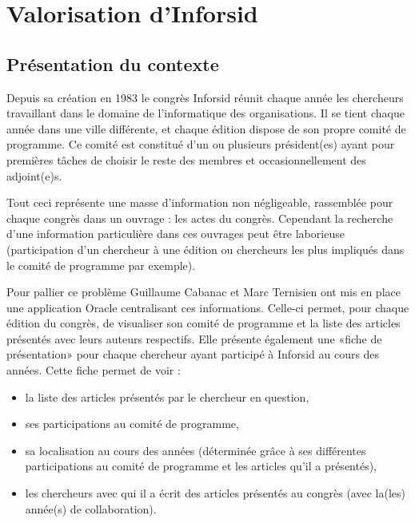 \cleardoublepage
{}

\chapter{Valorisation d'Inforsid}


	\section{Présentation du contexte}
		Depuis sa création en 1983 le congrès Inforsid réunit chaque année les chercheurs travaillant dans le domaine de l\rq{}informatique des organisations. Il se tient chaque année dans une ville différente, et chaque édition dispose de son propre comité de programme. Ce comité est constitué d\rq{}un ou plusieurs président(es) ayant pour premières tâches de choisir le reste des membres et occasionnellement des adjoint(e)s.
	
		Tout ceci représente une masse d\rq{}information non négligeable, rassemblée pour chaque congrès dans un ouvrage : les actes du congrès. Cependant la recherche d\rq{}une information particulière dans ces ouvrages peut être laborieuse (participation d\rq{}un chercheur à une édition ou chercheurs les plus impliqués dans le comité de programme par exemple).
		
		Pour pallier ce problème Guillaume Cabanac et Marc Ternisien ont mis en place une application Oracle centralisant ces informations. Celle-ci permet, pour chaque édition du congrès, de visualiser son comité de programme et la liste des articles présentés avec leurs auteurs respectifs. Elle présente également une «fiche de présentation» pour chaque chercheur ayant participé à Inforsid au cours des années. Cette fiche permet de voir :
		\begin{itemize}
			\item la liste des articles présentés par le chercheur en question,
			\item ses participations au comité de programme,
			\item sa localisation au cours des années (déterminée grâce à ses différentes participations au comité de programme et les articles qu\rq{}il a présentés),
			\item les chercheurs avec qui il a écrit des articles présentés au congrès (avec la(les) année(s) de collaboration).
		\end{itemize}
		
